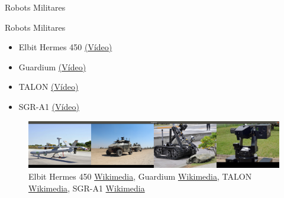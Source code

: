 
\begin{frame}[fragile]{Robots Militares}
\vspace{10px}
\pause
{}
\begin{block}{Robots Militares}
	\begin{itemize}
		\item Elbit Hermes 450 \href{https://www.youtube.com/watch?v=hpa9MkE58sM}{(Vídeo)}
		\pause
		\item Guardium \href{https://www.youtube.com/watch?v=ESS5lW_Os2Q}{(Vídeo)}
		\pause
		\item TALON \href{https://www.youtube.com/watch?v=kDtucLAXpm4}{(Vídeo)}
		\pause
		\item SGR-A1 \href{https://www.youtube.com/watch?v=azQzwI9-GHU}{(Vídeo)}
	\end{itemize}
\end{block}
\begin{figure}
	\centering
	\pause
	\centering
	\includegraphics[scale=0.11]{./EtapaModerna/Imagenes/robots_militares.png}
	\caption{Elbit Hermes 450 \href{https://commons.wikimedia.org/wiki/File:Vant_Hermes_450_da_FAB_no_aeroporto_de_C\%C3\%A1ceres_(MT)_(8101398607).jpg}{Wikimedia}, Guardium \href{https://ca.wikipedia.org/wiki/Fitxer:Flickr_-_Israel_Defense_Forces_-_Israeli_Made_Guardium_UGV_(5).jpg}{Wikimedia}, TALON \href{https://commons.wikimedia.org/wiki/File:US_Navy_090512-N-2013O-013_A_Mark_II_Talon_robot_from_Explosive_Ordnance_Disposal_Mobile_Unit_5,_Det._Japan,_is_used_to_inspect_a_suspicious_package_during_a_force_protection-anti-terrorism_training_exercise.jpg}{Wikimedia}, SGR-A1 \href{https://commons.wikimedia.org/wiki/File:SGR-A1.jpg}{Wikimedia}}
\end{figure}
\end{frame}


